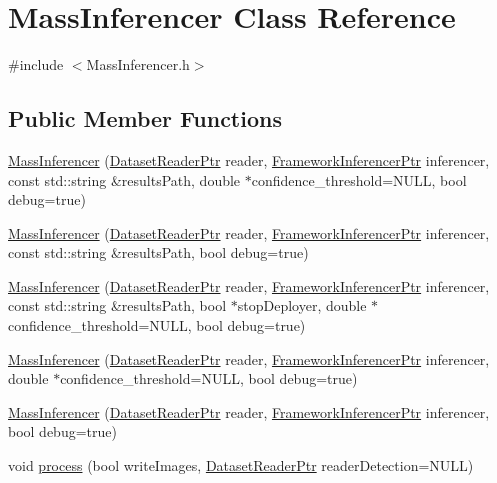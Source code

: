 \hypertarget{class_mass_inferencer}{}\section{Mass\+Inferencer Class Reference}
\label{class_mass_inferencer}


{\ttfamily \#include $<$Mass\+Inferencer.\+h$>$}

\subsection*{Public Member Functions}
\begin{DoxyCompactItemize}
\item 
\hyperlink{class_mass_inferencer_aa1f9519adb814a99f8c20a5d28d2f4e9}{Mass\+Inferencer} (\hyperlink{_dataset_reader_8h_a30d89cba514a220d64d04535c0465f1c}{Dataset\+Reader\+Ptr} reader, \hyperlink{_framework_inferencer_8h_a7b59ebc4b080d1be0d1a6240703011f2}{Framework\+Inferencer\+Ptr} inferencer, const std\+::string \&results\+Path, double $\ast$confidence\+\_\+threshold=N\+U\+LL, bool debug=true)
\item 
\hyperlink{class_mass_inferencer_a358995e115d7c7a015620ca42df10fe9}{Mass\+Inferencer} (\hyperlink{_dataset_reader_8h_a30d89cba514a220d64d04535c0465f1c}{Dataset\+Reader\+Ptr} reader, \hyperlink{_framework_inferencer_8h_a7b59ebc4b080d1be0d1a6240703011f2}{Framework\+Inferencer\+Ptr} inferencer, const std\+::string \&results\+Path, bool debug=true)
\item 
\hyperlink{class_mass_inferencer_a47dfb5d42669485a0390c579051e57f9}{Mass\+Inferencer} (\hyperlink{_dataset_reader_8h_a30d89cba514a220d64d04535c0465f1c}{Dataset\+Reader\+Ptr} reader, \hyperlink{_framework_inferencer_8h_a7b59ebc4b080d1be0d1a6240703011f2}{Framework\+Inferencer\+Ptr} inferencer, const std\+::string \&results\+Path, bool $\ast$stop\+Deployer, double $\ast$confidence\+\_\+threshold=N\+U\+LL, bool debug=true)
\item 
\hyperlink{class_mass_inferencer_afc617523cbd7df73545cda0755e9ff77}{Mass\+Inferencer} (\hyperlink{_dataset_reader_8h_a30d89cba514a220d64d04535c0465f1c}{Dataset\+Reader\+Ptr} reader, \hyperlink{_framework_inferencer_8h_a7b59ebc4b080d1be0d1a6240703011f2}{Framework\+Inferencer\+Ptr} inferencer, double $\ast$confidence\+\_\+threshold=N\+U\+LL, bool debug=true)
\item 
\hyperlink{class_mass_inferencer_a785c29013dd824096d2cf5992d5a1f86}{Mass\+Inferencer} (\hyperlink{_dataset_reader_8h_a30d89cba514a220d64d04535c0465f1c}{Dataset\+Reader\+Ptr} reader, \hyperlink{_framework_inferencer_8h_a7b59ebc4b080d1be0d1a6240703011f2}{Framework\+Inferencer\+Ptr} inferencer, bool debug=true)
\item 
void \hyperlink{class_mass_inferencer_a64197fd7172177a03d5e87f5dbf37dc3}{process} (bool write\+Images, \hyperlink{_dataset_reader_8h_a30d89cba514a220d64d04535c0465f1c}{Dataset\+Reader\+Ptr} reader\+Detection=N\+U\+LL)
\end{DoxyCompactItemize}


